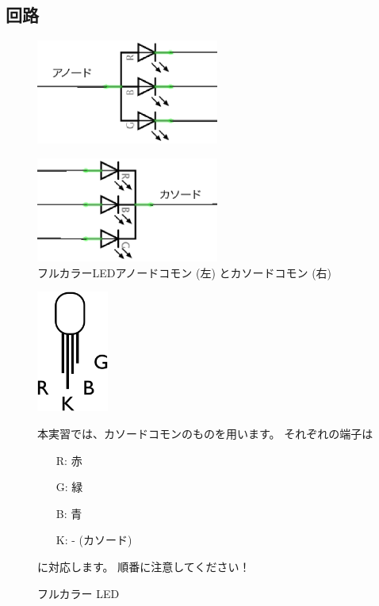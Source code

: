 \documentclass[11pt,a4paper]{jarticle}
\begin{document}
\subsection*{回路}
\begin{figure}[h!]
 \begin{minipage}{0.5\columnwidth}
  \centering
  \includegraphics[width=60mm]{img/fullColorLEDCommonAnode.eps}
  \label{circuit}
 \end{minipage}
 \begin{minipage}{0.5\columnwidth}
  \centering
  \includegraphics[width=60mm]{img/fullColorLEDCommonCathode.eps}
 \end{minipage}
 \caption{フルカラーLEDアノードコモン (左) とカソードコモン (右) }
  \label{fullColorLEDCommonAnode&Cathode}
\end{figure}

\begin{figure}[h!]
 \begin{minipage}{0.35\columnwidth}
  \centering
  \includegraphics[height=40mm]{img/full_color_led_detail.eps}
  \caption{フルカラー LED}
 \end{minipage}
 \begin{minipage}{0.65\columnwidth}
  本実習では、カソードコモンのものを用います。%
  それぞれの端子は
  \begin{itemize}
   \item[R:] 赤
   \item[G:] 緑
   \item[B:] 青
   \item[K:] - (カソード)
  \end{itemize}
  に対応します。
  順番に注意してください！
 \end{minipage}
\end{figure}
\end{document}
